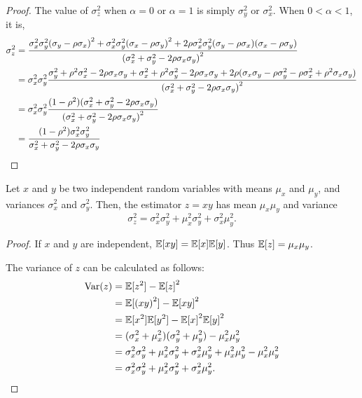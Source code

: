 \begin{proof}
  The value of $\sigma_z^2$ when $\alpha = 0$ or $\alpha=1$ is simply $\sigma_y^2$ or $\sigma_x^2$.
  When $0 < \alpha < 1$, it is,
  \begin{align*}
    \sigma_z^2
            &= \frac{%
            \sigma_x^2 \sigma_y^2 {(\sigma_y - \rho \sigma_x)}^2
            + \sigma_x^2 \sigma_y^2 {(\sigma_x - \rho \sigma_y)}^2
            + 2 \rho \sigma_x^2 \sigma_y^2 (\sigma_y - \rho \sigma_x) (\sigma_x - \rho \sigma_y)}{%
            {(\sigma_x^2 + \sigma_y^2 - 2\rho \sigma_x \sigma_y)}^2
            }\\
            &= \sigma_x^2 \sigma_y^2 
            \frac{%
             \sigma_y^2 + \rho^2 \sigma_x^2 - 2 \rho \sigma_x \sigma_y 
            + \sigma_x^2 + \rho^2 \sigma_y^2 - 2 \rho \sigma_x \sigma_y 
            + 2 \rho (\sigma_x \sigma_y - \rho \sigma_y^2 - \rho \sigma_x^2 + \rho^2 \sigma_x \sigma_y)}{%
            {(\sigma_x^2 + \sigma_y^2 - 2\rho \sigma_x \sigma_y)}^2
            }\\
            &= \sigma_x^2 \sigma_y^2 
            \frac{%
             (1 - \rho^2) (\sigma_x^2 + \sigma_y^2 - 2 \rho \sigma_x \sigma_y)}{%
             {(\sigma_x^2 + \sigma_y^2 - 2\rho \sigma_x \sigma_y)}^2
            }\\
            &= 
            \frac{(1 - \rho^2) \sigma_x^2 \sigma_y^2}{%
              \sigma_x^2 + \sigma_y^2 - 2\rho \sigma_x \sigma_y
            }\\
  \end{align*}
\end{proof}

\begin{lemma}
\label{lem:variance-product}
  Let $x$ and $y$ be two independent random variables with means $\mu_x$ and $\mu_y$, and variances $\sigma^2_x$ and $\sigma^2_y$.
  Then, the estimator $z = x y$ has mean $\mu_x \mu_y$ and variance
  $$\sigma^2_z = \sigma_x^2 \sigma_y^2 + \mu_x^2 \sigma_y^2 + \sigma_x^2 \mu_y^2.$$
\end{lemma}
\begin{proof}
  If $x$ and $y$ are independent, $\mathbb{E}[xy] = \mathbb{E}[x]\mathbb{E}[y]$. Thus $\mathbb{E}[z] = \mu_x \mu_y$.

  The variance of $z$ can be calculated as follows:
  \begin{align*}
    \text{Var}(z) &= \mathbb{E}[z^2] - {\mathbb{E}[z]}^2 \\
    &= \mathbb{E}[{(xy)}^2] - {\mathbb{E}[xy]}^2 \\
            &= \mathbb{E}[x^2] \mathbb{E}[y^2] - {\mathbb{E}[x]}^2 {\mathbb{E}[y]}^2 \\
            &= (\sigma^2_x + \mu_x^2)(\sigma^2_y + \mu_y^2) - \mu_x^2 \mu_y^2 \\
            &= \sigma_x^2 \sigma_y^2 + \mu_x^2 \sigma_y^2 + \sigma_x^2 \mu_y^2 + \mu_x^2 \mu_y^2 - \mu_x^2 \mu_y^2 \\
            &= \sigma_x^2 \sigma_y^2 + \mu_x^2 \sigma_y^2 + \sigma_x^2 \mu_y^2.
  \end{align*}
\end{proof}

